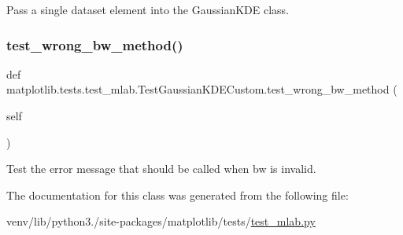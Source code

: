 \begin{DoxyVerb}Pass a single dataset element into the GaussianKDE class.\end{DoxyVerb}
 \mbox{\label{classmatplotlib_1_1tests_1_1test__mlab_1_1TestGaussianKDECustom_a5eecbf05e2e5792229d90ff9e31a8033}} 
\subsubsection{\texorpdfstring{test\+\_\+wrong\+\_\+bw\+\_\+method()}{test\_wrong\_bw\_method()}}
{\footnotesize\ttfamily def matplotlib.\+tests.\+test\+\_\+mlab.\+Test\+Gaussian\+K\+D\+E\+Custom.\+test\+\_\+wrong\+\_\+bw\+\_\+method (\begin{DoxyParamCaption}\item[{}]{self }\end{DoxyParamCaption})}

\begin{DoxyVerb}Test the error message that should be called when bw is invalid.\end{DoxyVerb}
 

The documentation for this class was generated from the following file\+:\begin{DoxyCompactItemize}
\item 
venv/lib/python3./site-\/packages/matplotlib/tests/\hyperlink{test__mlab_8py}{test\+\_\+mlab.\+py}\end{DoxyCompactItemize}

